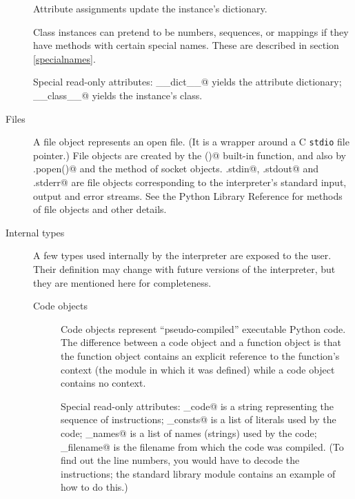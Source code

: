 \begin{description}
Attribute assignments update the instance's dictionary.

Class instances can pretend to be numbers, sequences, or mappings if
they have methods with certain special names.  These are described in
section \ref{specialnames}.

Special read-only attributes: \verb@__dict__@ yields the attribute
dictionary; \verb@__class__@ yields the instance's class.

\item[Files]
A file object represents an open file.  (It is a wrapper around a C
{\tt stdio} file pointer.)  File objects are created by the
\verb@open()@ built-in function, and also by \verb@posix.popen()@ and
the \verb@makefile@ method of socket objects.  \verb@sys.stdin@,
\verb@sys.stdout@ and \verb@sys.stderr@ are file objects corresponding
to the interpreter's standard input, output and error streams.
See the Python Library Reference for methods of file objects and other
details.

\item[Internal types]
A few types used internally by the interpreter are exposed to the user.
Their definition may change with future versions of the interpreter,
but they are mentioned here for completeness.

\begin{description}

\item[Code objects]
Code objects represent ``pseudo-compiled'' executable Python code.
The difference between a code
object and a function object is that the function object contains an
explicit reference to the function's context (the module in which it
was defined) while a code object contains no context.

Special read-only attributes: \verb@co_code@ is a string representing
the sequence of instructions; \verb@co_consts@ is a list of literals
used by the code; \verb@co_names@ is a list of names (strings) used by
the code; \verb@co_filename@ is the filename from which the code was
compiled.  (To find out the line numbers, you would have to decode the
instructions; the standard library module \verb@dis@ contains an
example of how to do this.)


\end{description}
\end{description}

